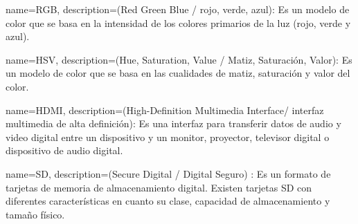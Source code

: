 {
  name=RGB,
  description={(Red Green Blue / rojo, verde, azul): Es un modelo de color que se basa en la intensidad de los colores primarios de la luz (rojo, verde y azul).}
}
  
{
  name=HSV,
  description={(Hue, Saturation, Value / Matiz, Saturación, Valor): Es un modelo de color que se basa en las cualidades de matiz, saturación y valor del color.}
}

{
  name=HDMI,
  description={(High-Definition Multimedia Interface/ interfaz multimedia de alta definición): Es una interfaz para transferir datos de audio y video digital entre un dispositivo y un monitor, proyector, televisor digital o dispositivo de audio digital.}
}

{
  name=SD,
  description={(Secure Digital / Digital Seguro) : Es un formato de tarjetas de memoria de almacenamiento digital. Existen tarjetas SD con diferentes características en cuanto su clase, capacidad de almacenamiento y tamaño físico.}
}  
 
